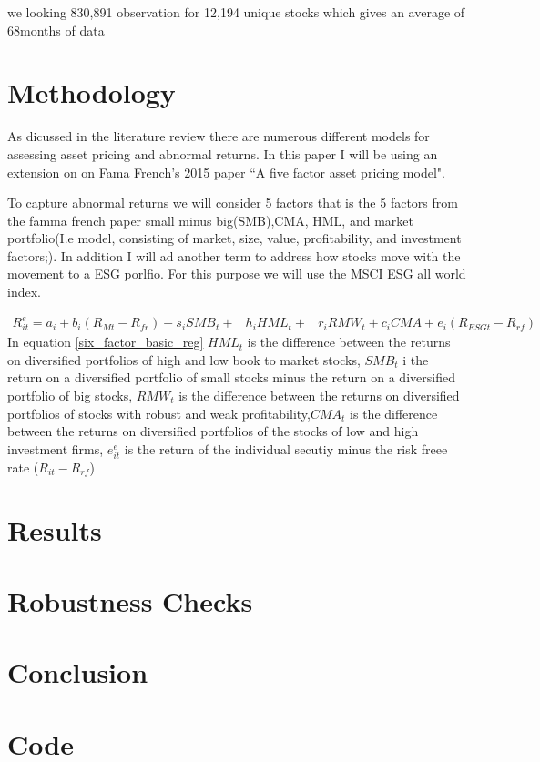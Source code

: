 \documentclass[12pt,oneside,reqno]{amsart}
\begin{document}
we looking 830,891 observation for  12,194 unique stocks which gives an average of 68months of data 
\section{Methodology}
\label{Methodology}
As dicussed in the literature review there are numerous different models for assessing asset pricing and abnormal returns. In this paper I will be using an extension on on Fama French's 2015 paper ``A five factor asset pricing model".

To capture abnormal returns we will consider 5 factors that is the 5 factors from the famma french paper small minus big(SMB),CMA, HML, and market portfolio(I.e model, consisting of market, size, value, profitability, and investment factors;). In addition I will ad another term to address how stocks move with the movement to a ESG porlfio. For this purpose we will use the MSCI ESG all world index. 

\begin{equation}
\begin{split}
    R_{it}^e = a_i+b_i(R_{Mt}-R_{fr})+s_iSMB_t+ & h_iHML_t+ & r_iRMW_t+c_iCMA+e_i(R_{ESG t}-R_{rf})
    \end{split}
    \label{six_factor_basic_reg}
\end{equation}
In equation \eqref{six_factor_basic_reg} $HML_{t}$ is the difference between the returns on diversified portfolios of high and low book to market stocks, $SMB_{t}$ i the return on a diversified portfolio of small stocks minus the return on a diversified portfolio of big stocks, $RMW_t$ is the difference between the returns on diversified portfolios of stocks with robust and weak profitability,$CMA_{t}$ is the difference between the returns on diversified portfolios of the stocks of low and high investment firms, $e^e_{it}$ is the return of the individual secutiy minus the risk freee rate ($R_{it}-R_{rf}$)


\section{Results}
\label{Results}

\section{Robustness Checks}
\label{Robustness}

\section{Conclusion}
\label{Conclusion}
\section{Code}

\end{document}
